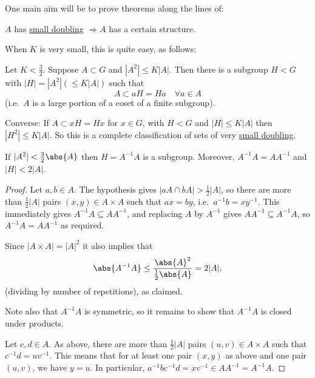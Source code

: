 \documentclass{article}
\numberwithin{equation}{section}
\begin{document}
One main aim will be to prove theorems along the lines of:
\begin{center}
  $A$ has \hyperlink{def:doubling}{small doubling} $\Rightarrow A$ has a certain structure.
\end{center}
When $K$ is very small, this is quite easy, as follows:

\begin{nthm}\label{thm:1.1}
  Let $K < \frac{3}{2}$. Suppose $A \subset G$ and $|A^2| \leq K|A|$.
  Then there is a subgroup $H < G$ with $|H| = |A^2| (\leq K|A|)$ such that
  \begin{equation*}A \subset aH = Ha \quad \forall a \in A\end{equation*}
  (i.e.\ $A$ is a large portion of a coset of a finite subgroup).
\end{nthm}
\begin{remark}
  Converse: If $A \subset xH = Hx$ for $x \in G$, with $H < G$ and $|H| \leq K|A|$ then $|H^2| \leq K|A|$.
  So this is a complete classification of sets of very \hyperlink{def:doubling}{small doubling}.
\end{remark}
\begin{nlemma}[Identify $H$]\label{lem:1.2}
  If $|A^2| < \frac{3}{2}\abs{A}$ then $H = A^{-1} A$ is a subgroup.
  Moreover, $A^{-1}A = A A^{-1}$ and $|H| < 2 |A|$.
\end{nlemma}
\begin{proof}
  Let $a,b \in A$.
  The hypothesis gives $|aA \cap bA| > \frac{1}{2}|A|$, so there are more than $\frac{1}{2} |A|$ pairs $(x,y) \in A \times A$ such that $ax = by$, i.e.\ $a^{-1} b = x y^{-1}$.
  This immediately gives $A^{-1} A \subseteq A A^{-1}$, and replacing $A$ by $A^{-1}$ gives $A A^{-1} \subseteq A^{-1} A$, so $A^{-1}A = A A^{-1}$ as required.

  Since $|A \times A| = |A|^2$ it also implies that
  \begin{equation*}
    \abs{A^{-1}A} \leq \frac{\abs{A}^2}{\frac 12 \abs{A}} = 2 |A|,
  \end{equation*}
  (dividing by number of repetitions), as claimed.

  Note also that $A^{-1}A$ is symmetric, so it remains to show that $A^{-1}A$ is closed under products.

  Let $c,d \in A$. As above, there are more than $\frac{1}{2}|A|$ pairs $(u,v) \in A \times A$ such that $c^{-1} d = u v^{-1}$.
  This means that for at least one pair $(x,y)$ as above and one pair $(u,v)$, we have $y=u$.
  In particular, $a^{-1} b c^{-1} d = x v^{-1} \in A A^{-1} = A^{-1} A$.
\end{proof}
\end{document}
